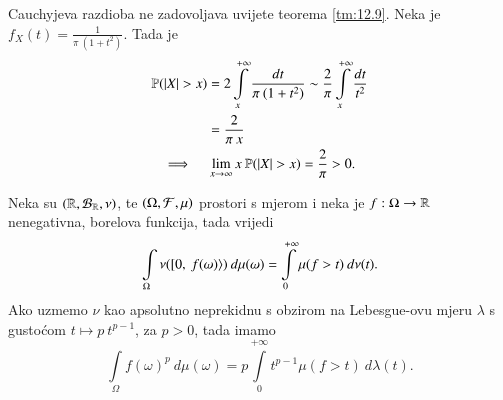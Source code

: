 \begin{pr}  \label{pr:12.11}
    Cauchyjeva razdioba ne zadovoljava uvijete teorema \ref{tm:12.9}.
    Neka je $f_X (t) = \frac{1}{\pi \: (1 + t^2)}$.
    Tada je
    \begin{equation*}
        \begin{gathered}
            \begin{aligned}
                \mathbb{P}({|X| > x}) &= 2 \int\limits_x^{+\infty} \frac{dt}{\pi \: (1 + t^2)} \sim \frac{2}{\pi} \int\limits_x^{+\infty} \frac{dt}{t^2}\\
                &= \frac{2}{\pi \: x}
            \end{aligned}\\
            \implies \quad \lim\limits_{x \to \infty} x \: \mathbb{P}({|X| > x}) = \frac{2}{\pi} > 0.
        \end{gathered}
    \end{equation*}
\end{pr}

\begin{tm}  \label{tm:12.11-1}
    Neka su $(\mathbb{R}, \mathcal{B}_{\mathbb{R}}, \nu)$, te $ (\Omega, \mathcal{F}, \mu) $ prostori s mjerom i neka je $f : \Omega \to \mathbb{R}$ nenegativna, borelova funkcija, tada vrijedi
    \begin{equation*}
        \int\limits_\Omega \nu ([ {0}, \: {f(\omega)} \rangle) \: d \mu (\omega) = \int\limits_{0}^{+\infty} \mu (f>t) \: d \nu (t).
    \end{equation*}
    Ako uzmemo $\nu$ kao apsolutno neprekidnu s obzirom na Lebesgue-ovu mjeru $\lambda$ s gusto\' com $t \mapsto p \: t^{p-1}$, za $p>0$, tada imamo
    \begin{equation*}
        \int\limits_\Omega f(\omega)^p \: d \mu (\omega) = p \int\limits_{0}^{+\infty} t^{p-1} \mu (f > t) \: d \lambda (t).
    \end{equation*}
\end{tm}

